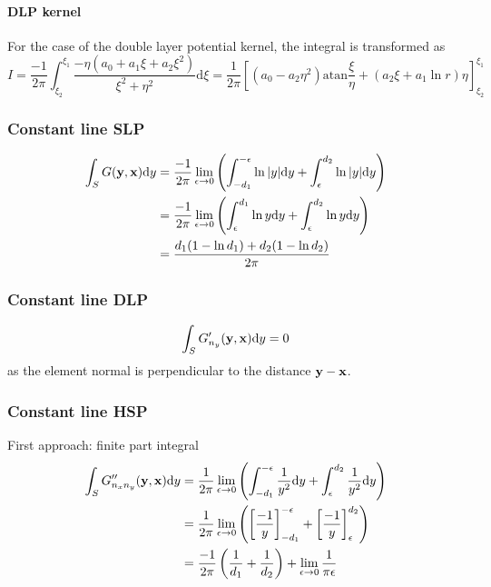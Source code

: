 \documentclass[a4paper,11pt]{article}
\newcommand{\td}{\mathrm{d}}
\newcommand{\atan}{\mathrm{atan}}
\begin{document}
\paragraph{DLP kernel}

For the case of the double layer potential kernel, the integral is transformed as
%
\begin{equation}
I = \frac{-1}{2\pi} \int_{\xi_2}^{\xi_1} \frac{-\eta \left(a_0 + a_1 \xi + a_2 \xi^2 \right)}{\xi^2+\eta^2}\td \xi
= \frac{1}{2\pi} \left[
\left( a_0 - a_2 \eta^2\right) \atan \frac{\xi}{\eta} + \left(a_2 \xi + a_1 \ln r\right) \eta
\right]_{\xi_2}^{\xi_1}
\end{equation}

\subsubsection{Constant line SLP}

\begin{align}
\int_{S} G({\bf y}, {\bf x}) \td y
& = \frac{-1}{2\pi}\lim_{\epsilon \to 0}
\left( \int_{-d_1}^{-\epsilon} \ln |y| \td y + \int_{\epsilon}^{d_2}  \ln |y| \td y \right) \nonumber \\
& = \frac{-1}{2\pi}\lim_{\epsilon \to 0}
\left( \int_{\epsilon}^{d_1} \ln y \td y + \int_{\epsilon}^{d_2}  \ln y \td y \right) \nonumber \\
&=
\frac{d_1(1-\ln d_1) + d_2(1-\ln d_2)}{2\pi}
\end{align}

\subsubsection{Constant line DLP}

\begin{equation}
\int_{S} G'_{n_y}({\bf y}, {\bf x}) \td y = 0
\end{equation}
%
as the element normal is perpendicular to the distance ${\bf y}-{\bf x}$.

\subsubsection{Constant line HSP}

First approach: finite part integral
%
\begin{align}
\int_{S} G''_{n_x n_y}({\bf y}, {\bf x}) \td y
&= \frac{1}{2\pi} \lim_{\epsilon \to 0} \left(\int_{-d_1}^{-\epsilon} \frac{1}{y^2}\td y + \int_{\epsilon}^{d_2} \frac{1}{y^2} \td y\right) \nonumber \\
&= \frac{1}{2\pi} \lim_{\epsilon \to 0} \left(\left[\frac{-1}{y}\right]_{-d_1}^{-\epsilon} +  \left[\frac{-1}{y}\right]_{\epsilon}^{d_2} \right)
\nonumber \\
&= \frac{-1}{2\pi} \left(\frac{1}{d_1} +  \frac{1}{d_2} \right) + \lim_{\epsilon \to 0} \frac{1}{\pi\epsilon}
\end{align}
\end{document}
